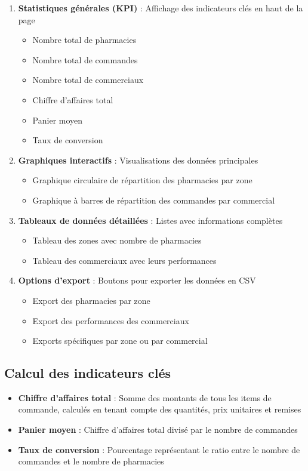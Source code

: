 \documentclass[12pt,a4paper]{article}
\begin{document}
\begin{enumerate}
    \item \textbf{Statistiques générales (KPI)} : Affichage des indicateurs clés en haut de la page
    \begin{itemize}
        \item Nombre total de pharmacies
        \item Nombre total de commandes
        \item Nombre total de commerciaux
        \item Chiffre d'affaires total
        \item Panier moyen
        \item Taux de conversion
    \end{itemize}
    
    \item \textbf{Graphiques interactifs} : Visualisations des données principales
    \begin{itemize}
        \item Graphique circulaire de répartition des pharmacies par zone
        \item Graphique à barres de répartition des commandes par commercial
    \end{itemize}
    
    \item \textbf{Tableaux de données détaillées} : Listes avec informations complètes
    \begin{itemize}
        \item Tableau des zones avec nombre de pharmacies
        \item Tableau des commerciaux avec leurs performances
    \end{itemize}
    
    \item \textbf{Options d'export} : Boutons pour exporter les données en CSV
    \begin{itemize}
        \item Export des pharmacies par zone
        \item Export des performances des commerciaux
        \item Exports spécifiques par zone ou par commercial
    \end{itemize}
\end{enumerate}

\subsection{Calcul des indicateurs clés}
\begin{itemize}
    \item \textbf{Chiffre d'affaires total} : Somme des montants de tous les items de commande, calculés en tenant compte des quantités, prix unitaires et remises
    \item \textbf{Panier moyen} : Chiffre d'affaires total divisé par le nombre de commandes
    \item \textbf{Taux de conversion} : Pourcentage représentant le ratio entre le nombre de commandes et le nombre de pharmacies
\end{itemize}
\end{document}
